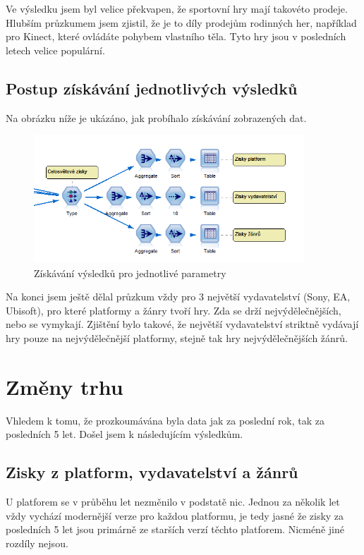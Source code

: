 \documentclass[FM,ZP]{tulthesis}
\begin{document}
Ve výsledku jsem byl velice překvapen, že sportovní hry mají takovéto prodeje. Hlubším průzkumem jsem zjistil, že je to díly prodejům rodinných her, například pro Kinect, které ovládáte pohybem vlastního těla. Tyto hry jsou v posledních letech velice populární.

\subsection{Postup získávání jednotlivých výsledků}
Na obrázku níže je ukázáno, jak probíhalo získávání zobrazených dat.

\begin{figure}[H]
\begin{center}
\includegraphics[width=0.9\textwidth]{images/oneYearParametres.png}
\caption{Získávání výsledků pro jednotlivé parametry}
\label{image}
\end{center}
\end{figure}

Na konci jsem ještě dělal průzkum vždy pro 3 největší vydavatelství (Sony, EA, Ubisoft), pro které platformy a žánry tvoří hry. Zda se drží nejvýdělečnějších, nebo se vymykají. Zjištění bylo takové, že největší vydavatelství striktně vydávají hry pouze na nejvýdělečnější platformy, stejně tak hry nejvýdělečnějších žánrů.

\section{Změny trhu}
Vhledem k tomu, že prozkoumávána byla data jak za poslední rok, tak za posledních 5 let. Došel jsem k následujícím výsledkům.

\subsection{Zisky z platform, vydavatelství a žánrů}
U platforem se v průběhu let nezměnilo v podstatě nic. Jednou za několik let vždy vychází modernější verze pro každou platformu, je tedy jasné že zisky za posledních 5 let jsou primárně ze starších verzí těchto platforem. Nicméně jiné rozdíly nejsou.
\end{document}
